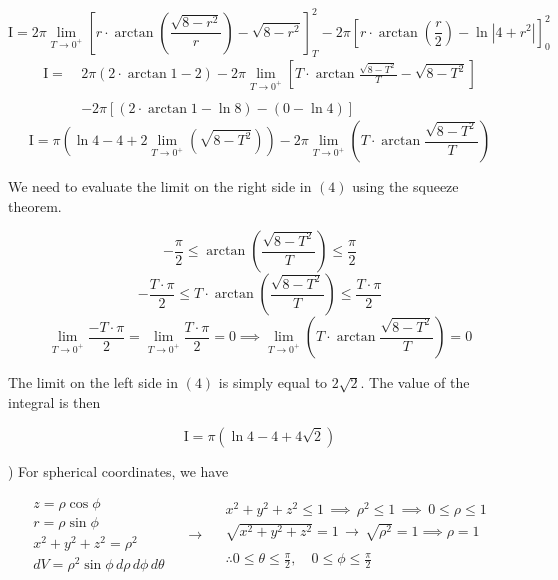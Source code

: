 \documentclass{article}
\begin{document}
\begin{equation*}
\mathrm{I}=2\pi\lim_{T\to0^+}\left[r\cdot\arctan\left(\frac{\sqrt{8-r^2}}r\right)-\sqrt{8-r^2}\right]_T^2-2\pi\left[r\cdot\arctan\left(\frac r2\right)-\ln\left|4+r^2\right|\right]_0^2
\end{equation*}
\begin{align*}
\mathrm{I}=\:&2\pi\left(2\cdot\arctan1-2\right)-2\pi\lim_{T\to0^+}\left[T\cdot\arctan\frac{\sqrt{8-T^2}}T-\sqrt{8-T^2}\right]\\\\&-2\pi\left[\left(2\cdot\arctan1-\ln8\right)-(0-\ln4)\right]
\end{align*}
\begin{equation}
\mathrm{I}=\pi\left(\ln4-4+2\lim_{T\to0^+}\left(\sqrt{8-T^2}\right)\right)-2\pi\lim_{T\to0^+}\left(T\cdot\arctan\frac{\sqrt{8-T^2}}T\right)
\end{equation}

\hfill

\noindent We need to evaluate the limit on the right side in $(4)$ using the squeeze theorem.

\[-\frac\pi2\leq\arctan\left(\frac{\sqrt{8-T^2}}T\right)\leq\frac\pi2\]
\[-\frac{T\cdot\pi}2\leq T\cdot\arctan\left(\frac{\sqrt{8-T^2}}T\right)\leq\frac{T\cdot\pi}2\]
\[\lim_{T\to0^+}\frac{-T\cdot\pi}2=\lim_{T\to0^+}\frac{T\cdot\pi}2=0\implies\lim_{T\to0^+}\left(T\cdot\arctan\frac{\sqrt{8-T^2}}T\right)=0\]

\newpage

\noindent The limit on the left side in $(4)$ is simply equal to $2\sqrt2$. The value of the integral is then

\[\boxed{\mathrm{I}=\pi\left(\ln4-4+4\sqrt2\right)}\]

\hfill

) For spherical coordinates, we have

\[
\begin{array}{c}
z=\rho\cos\phi\\
r=\rho\sin\phi\\
x^2+y^2+z^2=\rho^2\\
dV=\rho^2\sin\phi\,d\rho\,d\phi\,d\theta
\end{array}\quad\rightarrow\quad
\begin{array}{c}
x^2+y^2+z^2\leq1\,\implies\,\rho^2\leq1\,\implies\,0\leq\rho\leq1\\
\sqrt{x^2+y^2+z^2}=1\,\rightarrow\,\sqrt{\rho^2}=1\implies\rho=1\\\\
\displaystyle\therefore0\leq\theta\leq\frac\pi2,\quad0\leq\phi\leq\frac\pi2
\end{array}
\]
\end{document}
